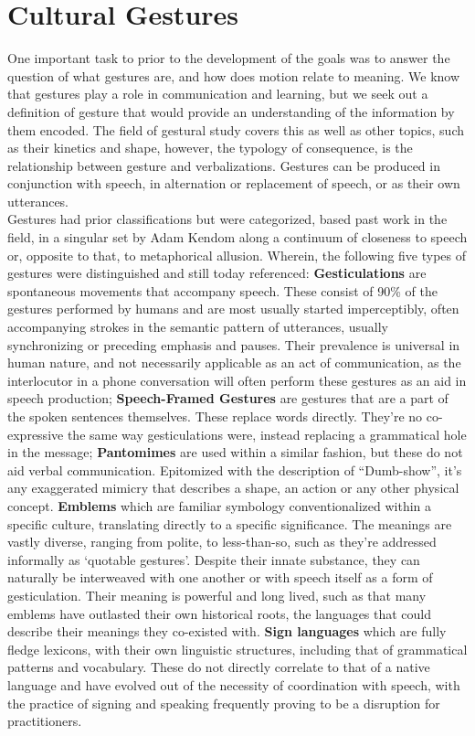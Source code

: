 \section{Cultural Gestures} \label{sec:cul_Cultural_Gestures}
    One important task to prior to the development of the goals was to answer the question of what gestures are, and how does motion relate to meaning. We know that gestures play a role in communication and learning\cite{pine2004more}\cite{macedonia2012gestures}, but we seek out a definition of gesture that would provide an understanding of the information by them encoded. The field of gestural study covers this as well as other topics\cite{kendon1996agenda}, such as their kinetics and shape, however, the typology of consequence, is the relationship between gesture and verbalizations. Gestures can be produced in conjunction with speech, in alternation or replacement of speech, or as their own utterances. \\
    Gestures had prior classifications but were categorized, based past work in the field, in a singular set by Adam Kendom\cite{mcneill1987} along a continuum of closeness to speech or, opposite to that, to metaphorical allusion. Wherein, the following five types of gestures were distinguished and still today referenced\cite{mcneill2014}\cite{mitra2007}: \textbf{Gesticulations} are spontaneous movements that accompany speech. These consist of 90\% of the gestures performed by humans and are most usually started imperceptibly, often accompanying strokes in the semantic pattern of utterances, usually synchronizing or preceding emphasis and pauses. Their prevalence is universal in human nature, and not necessarily applicable as an act of communication, as the interlocutor in a phone conversation will often perform these gestures as an aid in speech production; \textbf{Speech-Framed Gestures} are gestures that are a part of the spoken sentences themselves. These replace words directly. They’re no co-expressive the same way gesticulations were, instead replacing a grammatical hole in the message; \textbf{Pantomimes} are used within a similar fashion, but these do not aid verbal communication. Epitomized with the description of “Dumb-show”, it’s any exaggerated mimicry that describes a shape, an action or any other physical concept. \textbf{Emblems} which are familiar symbology conventionalized within a specific culture, translating directly to a specific significance. The meanings are vastly diverse, ranging from polite, to less-than-so, such as they’re addressed informally as ‘quotable gestures’. Despite their innate substance, they can naturally be interweaved with one another or with speech itself as a form of gesticulation. Their meaning is powerful and long lived, such as that many emblems have outlasted their own historical roots, the languages that could describe their meanings they co-existed with. \textbf{Sign languages} which are fully fledge lexicons, with their own linguistic structures, including that of grammatical patterns and vocabulary. These do not directly correlate to that of a native language and have evolved out of the necessity of coordination with speech, with the practice of signing and speaking frequently proving to be a disruption for practitioners.\\
